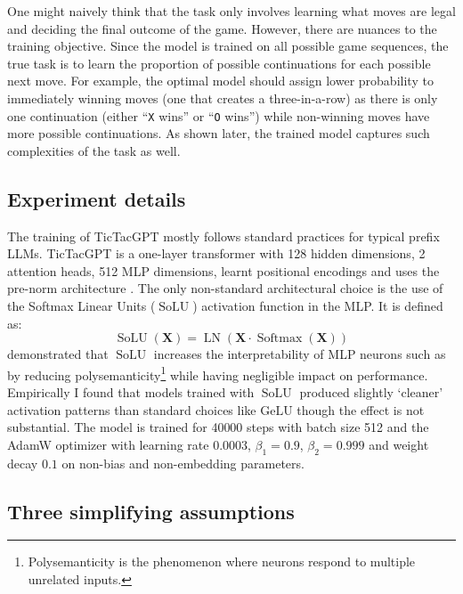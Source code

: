 \documentclass{article}
\newcommand{\ttgpt}{TicTacGPT\xspace}
\newcommand{\m}[1]{\mathbf{\bm{#1}}}
\DeclareMathOperator{\softmax}{Softmax}
\DeclareMathOperator{\solu}{SoLU}
\DeclareMathOperator{\layernorm}{LN}
\begin{document}
One might naively think that the task only involves learning what moves are legal and deciding the final outcome of the game. However, there are nuances to the training objective. Since the model is trained on all possible game sequences, the true task is to learn the proportion of possible continuations for each possible next move. For example, the optimal model should assign lower probability to immediately winning moves (one that creates a three-in-a-row) as there is only one continuation (either ``\texttt{X} wins'' or ``\texttt{O} wins'') while non-winning moves have more possible continuations. As shown later, the trained model captures such complexities of the task as well.

\subsection{Experiment details}

The training of \ttgpt mostly follows standard practices \citep{radford2019language} for typical prefix \ac{LLMs}. \ttgpt is a one-layer transformer with 128 hidden dimensions, 2 attention heads, 512 MLP dimensions, learnt positional encodings and uses the pre-norm architecture \citep{xiong2020layer}. The only non-standard architectural choice is the use of the Softmax Linear Units ($\solu$) \citep{elhage2022solu} activation function in the MLP. It is defined as:
\begin{equation*}
    \solu(\m{X}) = \layernorm(\m{X} \cdot \softmax(\m{X}))
\end{equation*}
\citet{elhage2022solu} demonstrated that $\solu$ increases the interpretability of MLP neurons such as by reducing polysemanticity\footnote{Polysemanticity is the phenomenon where neurons respond to multiple unrelated inputs.}\citep{olah2020zoom} while having negligible impact on performance. Empirically I found that models trained with $\solu$ produced slightly `cleaner' activation patterns than standard choices like $\text{GeLU}$ though the effect is not substantial. The model is trained for 40000 steps with batch size 512 and the AdamW optimizer \citep{loshchilov2017decoupled} with learning rate $0.0003$, $\beta_1 = 0.9$, $\beta_2 = 0.999$ and weight decay $0.1$ on non-bias and non-embedding parameters.

\subsection{Three simplifying assumptions} \label{sec:simplify}
\end{document}
